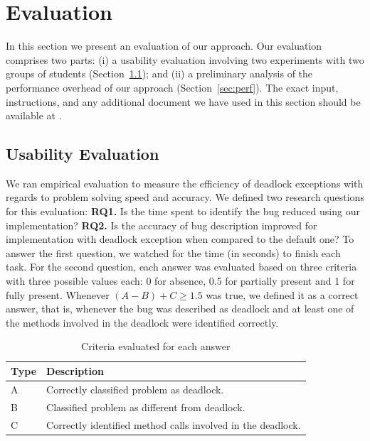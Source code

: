 \section{Evaluation}

In this section we present an evaluation of our approach. Our evaluation comprises two parts: (i) a usability evaluation involving two experiments with two groups of students (Section~\ref{sec:usab}); and (ii) a preliminary analysis of the performance overhead of our approach (Section~\ref{sec:perf}). The exact input, instructions, and any additional document we have used in this section should be available at \cite{repo}.

\subsection{Usability Evaluation}\label{sec:usab}

We ran empirical evaluation to measure the efficiency of deadlock exceptions with regards to problem solving speed and accuracy. We defined two research questions for this evaluation: {\bf RQ1.} Is the time spent to identify the bug reduced using our implementation? {\bf RQ2.} Is the accuracy of bug description improved for implementation with deadlock exception when compared to the default one? To answer the first question, we watched for the time (in seconds) to finish each task. For the second question, each answer was evaluated based on three criteria with three possible values each: 0 for absence, 0.5 for partially present and 1 for fully present. Whenever $(A - B) + C \geq 1.5$ was true, we defined it as a correct answer, that is, whenever the bug was described as deadlock and at least one of the methods involved in the deadlock were identified correctly.

\begin{table}
\begin{center}
\caption{Criteria evaluated for each answer}
\begin{tabular}{|l|l|}
\hline
Type & Description \\
\hline
A & Correctly classified problem as deadlock.\\
B & Classified problem as different from deadlock.\\
C & Correctly identified method calls involved in the deadlock.\\
\hline
\end{tabular}
\end{center}
\end{table}


